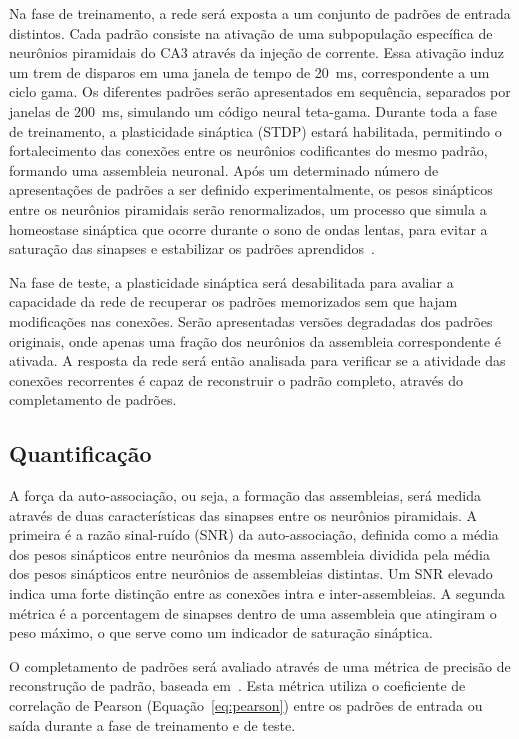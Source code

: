 Na fase de treinamento, a rede será exposta a um conjunto de padrões de entrada distintos. Cada padrão consiste na ativação de uma
subpopulação específica de neurônios piramidais do CA3 através da injeção de corrente. Essa ativação induz um trem de disparos em
uma janela de tempo de \SI{20}{\milli\second}, correspondente a um ciclo gama. Os diferentes padrões serão apresentados em
sequência, separados por janelas de \SI{200}{\milli\second}, simulando um código neural teta-gama. Durante toda a fase de
treinamento, a plasticidade sináptica (STDP) estará habilitada, permitindo o fortalecimento das conexões entre os neurônios
codificantes do mesmo padrão, formando uma assembleia neuronal. Após um determinado número de apresentações de padrões a ser
definido experimentalmente, os pesos sinápticos entre os neurônios piramidais serão renormalizados, um processo que simula a
homeostase sináptica que ocorre durante o sono de ondas lentas, para evitar a saturação das sinapses e estabilizar os padrões
aprendidos~\cite{gonzalez-ruedaActivityDependent2018, kopsickFormation2024}.

Na fase de teste, a plasticidade sináptica será desabilitada para avaliar a capacidade da rede de recuperar os padrões memorizados
sem que hajam modificações nas conexões. Serão apresentadas versões degradadas dos padrões originais, onde apenas uma fração dos
neurônios da assembleia correspondente é ativada. A resposta da rede será então analisada para verificar se a atividade das
conexões recorrentes é capaz de reconstruir o padrão completo, através do completamento de padrões.

\subsection{Quantificação}

A força da auto-associação, ou seja, a formação das assembleias, será medida através de duas características das sinapses entre os
neurônios piramidais. A primeira é a razão sinal-ruído (SNR) da auto-associação, definida como a média dos pesos sinápticos entre
neurônios da mesma assembleia dividida pela média dos pesos sinápticos entre neurônios de assembleias distintas. Um SNR elevado
indica uma forte distinção entre as conexões intra e inter-assembleias. A segunda métrica é a porcentagem de sinapses dentro de
uma assembleia que atingiram o peso máximo, o que serve como um indicador de saturação sináptica.

O completamento de padrões será avaliado através de uma métrica de precisão de reconstrução de padrão, baseada
em~\cite{kopsickFormation2024}. Esta métrica utiliza o coeficiente de correlação de Pearson (Equação~\ref{eq:pearson}) entre os
padrões de entrada ou saída durante a fase de treinamento e de teste. 

